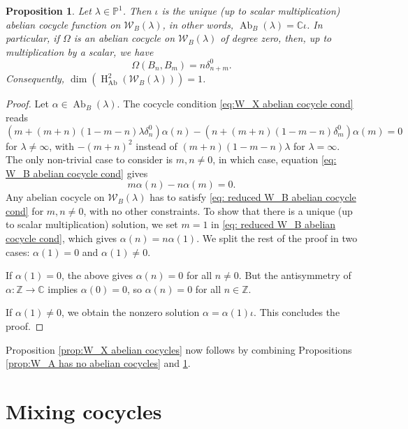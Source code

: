 \documentclass[11pt, svgnames]{amsart}
\newcommand{\ZZ}{\mathbb{Z}}
\newcommand{\CC}{\mathbb{C}}
\newcommand{\PP}{\mathbb{P}}
\newcommand{\W}{\mathcal{W}}
\DeclareMathOperator{\HH}{H}
\DeclareMathOperator{\Ab}{Ab}
\newtheorem{proposition}{Proposition}[section]
\theoremstyle{definition}
\begin{document}
\begin{proposition}\label{prop:W_B abelian cocycles}
    Let $\lambda \in \PP^1$. Then $\iota$ is the unique (up to scalar multiplication) abelian cocycle function on $\W_B(\lambda)$, in other words, $\Ab_B(\lambda) = \CC \iota$. In particular, if $\Omega$ is an abelian cocycle on $\W_B(\lambda)$ of degree zero, then, up to multiplication by a scalar, we have
    $$\Omega(B_n,B_m) = n\delta_{n+m}^0.$$
    Consequently, $\dim(\HH_{\Ab}^2(\W_B(\lambda))) = 1$.
\end{proposition}
\begin{proof}
    Let $\alpha \in \Ab_B(\lambda)$. The cocycle condition \eqref{eq:W_X abelian cocycle cond} reads
    \begin{equation}
        \label{eq: W_B abelian cocycle cond}
        (m+(m+n)(1-m-n)\lambda\delta^0_n)\alpha(n)-(n+(m+n)(1-m-n)\delta^0_m)\alpha(m)=0
    \end{equation}
    for $\lambda\neq\infty$, with $- (m+n)^2$ instead of $(m+n)(1-m-n)\lambda$ for $\lambda=\infty$. The only non-trivial case to consider is $m,n\neq0$, in which case, equation \eqref{eq: W_B abelian cocycle cond} gives
    \begin{equation}
    \label{eq: reduced W_B abelian cocycle cond}
        m\alpha(n)-n\alpha(m)=0.
    \end{equation}
    Any abelian cocycle on $\W_B(\lambda)$ has to satisfy \eqref{eq: reduced W_B abelian cocycle cond} for $m,n\neq 0$, with no other constraints. To show that there is a unique (up to scalar multiplication) solution, we set $m=1$ in \eqref{eq: reduced W_B abelian cocycle cond}, which gives $\alpha(n)=n\alpha(1)$. We split the rest of the proof in two cases: $\alpha(1) = 0$ and $\alpha(1) \neq 0$.
    
    If $\alpha(1)=0$, the above gives $\alpha(n)=0$ for all $n \neq 0$. But the antisymmetry of $\alpha \colon \ZZ\rightarrow\CC$ implies $\alpha(0)=0$, so $\alpha(n)=0$ for all $n\in\ZZ$.

    If $\alpha(1)\neq 0$, we obtain the nonzero solution $\alpha = \alpha(1) \iota$. This concludes the proof.
\end{proof}

Proposition \ref{prop:W_X abelian cocycles} now follows by combining Propositions \ref{prop:W_A has no abelian cocycles} and \ref{prop:W_B abelian cocycles}.

\section{Mixing cocycles}\label{sec:mixing cocycles}
\end{document}
